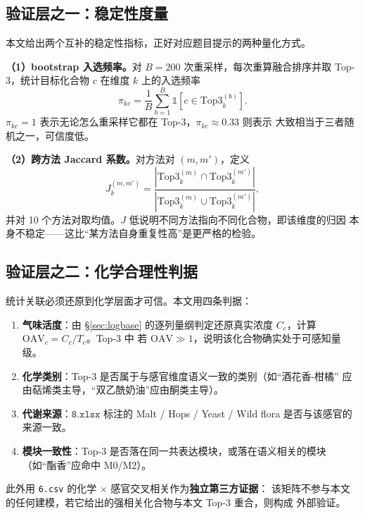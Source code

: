 \subsection{验证层之一：稳定性度量}

本文给出两个互补的稳定性指标，正好对应题目提示的两种量化方式。

\textbf{（1）bootstrap 入选频率。}对 $B=200$ 次重采样，每次重算融合排序并取
Top-3，统计目标化合物 $c$ 在维度 $k$ 上的入选频率
\begin{equation}
\pi_{kc}=\frac{1}{B}\sum_{b=1}^{B}\mathbb{1}\left[c\in \mathrm{Top3}^{(b)}_k\right].
\label{eq:bootfreq}
\end{equation}
$\pi_{kc}=1$ 表示无论怎么重采样它都在 Top-3，$\pi_{kc}\approx 0.33$ 则表示
大致相当于三者随机之一，可信度低。

\textbf{（2）跨方法 Jaccard 系数。}对方法对 $(m,m')$，定义
\begin{equation}
J^{(m,m')}_{k}=\frac{\left|\mathrm{Top3}^{(m)}_k\cap \mathrm{Top3}^{(m')}_k\right|}
{\left|\mathrm{Top3}^{(m)}_k\cup \mathrm{Top3}^{(m')}_k\right|},
\label{eq:jaccard}
\end{equation}
并对 10 个方法对取均值。$J$ 低说明不同方法指向不同化合物，即该维度的归因
本身不稳定——这比“某方法自身重复性高”是更严格的检验。

\subsection{验证层之二：化学合理性判据}

统计关联必须还原到化学层面才可信。本文用四条判据：
\begin{enumerate}[label=(\arabic*),leftmargin=2.2em,itemsep=1pt]
\item \textbf{气味活度}：由 \S\ref{sec:logbase} 的逐列量纲判定还原真实浓度
  $C_c$，计算 $\mathrm{OAV}_c=C_c/T_c$\cite{grosch1994,grosch1993}。Top-3 中
  若 $\mathrm{OAV}\gg1$，说明该化合物确实处于可感知量级。
\item \textbf{化学类别}：Top-3 是否属于与感官维度语义一致的类别（如“酒花香-柑橘”
  应由萜烯类主导，“双乙酰奶油”应由酮类主导）。
\item \textbf{代谢来源}：$\texttt{8.xlsx}$ 标注的 Malt / Hops / Yeast / Wild
  flora 是否与该感官的来源一致。
\item \textbf{模块一致性}：Top-3 是否落在同一共表达模块，或落在语义相关的模块
  （如“酯香”应命中 M0/M2）。
\end{enumerate}
此外用 \texttt{6.csv} 的化学 $\times$ 感官交叉相关作为\textbf{独立第三方证据}：
该矩阵不参与本文的任何建模，若它给出的强相关化合物与本文 Top-3 重合，则构成
外部验证。
